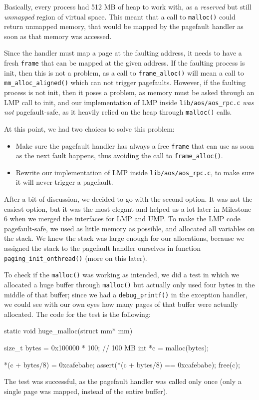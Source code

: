 \documentclass[a4paper,twoside,openright]{report}
\renewcommand{\t}[1]{%
	{\texttt{#1}}}
\begin{document}
Basically, every process had 512 MB of heap to work with, as a \emph{reserved}
but still \emph{unmapped} region of virtual space. This meant that a call to
\t{malloc()} could return unmapped memory, that would be mapped by the
pagefault handler as soon as that memory was accessed.

Since the handler must map a page at the faulting address, it needs to have a
fresh \t{frame} that can be mapped at the given address. If the faulting
process is init, then this is not a problem, as a call to \t{frame\_alloc()}
will mean a call to \t{mm\_alloc\_aligned()} which can not trigger pagefaults.
However, if the faulting process is not init, then it poses a problem, as
memory must be asked through an LMP call to init, and our implementation of LMP
inside \t{lib/aos/aos\_rpc.c} \emph{was not} pagefault-safe, as it heavily
relied on the heap through \t{malloc()} calls.

At this point, we had two choices to solve this problem:
\begin{itemize}
	\item Make sure the pagefault handler has always a free \t{frame} that can
		use as soon as the next fault happens, thus avoiding the call to
		\t{frame\_alloc()}.
	\item Rewrite our implementation of LMP inside \t{lib/aos/aos\_rpc.c}, to
		make sure it will never trigger a pagefault.
\end{itemize}

After a bit of discussion, we decided to go with the second option. It was not
the easiest option, but it was the most elegant and helped us a lot later in
Milestone 6 when we merged the interfaces for LMP and UMP. To make the LMP
code pagefault-safe, we used as little memory as possible, and allocated all
variables on the stack. We knew the stack was large enough for our allocations,
because we assigned the stack to the pagefault handler ourselves in function
\t{paging\_init\_onthread()} (more on this later).

To check if the \t{malloc()} was working as intended, we did a test in which we
allocated a huge buffer through \t{malloc()} but actually only used four bytes
in the middle of that buffer; since we had a \t{debug\_printf()} in the
exception handler, we could see with our own eyes how many pages of that buffer
were actually allocated. The code for the test is the following:
\begin{pandacode}
static void huge_malloc(struct mm* mm) {
	size_t bytes = 0x100000 * 100; // 100 MB
	int *c = malloc(bytes);

	*(c + bytes/8) = 0xcafebabe;
	assert(*(c + bytes/8) == 0xcafebabe);
	free(c);
}
\end{pandacode}
The test was successful, as the pagefault handler was called only once (only a
single page was mapped, instead of the entire buffer).
\end{document}
